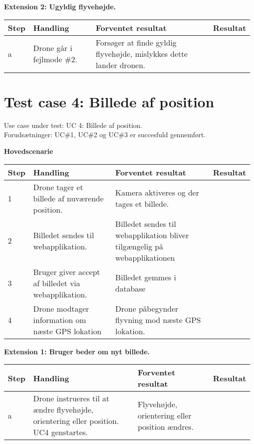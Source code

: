 \textbf{Extension 2: Ugyldig flyvehøjde.}
\begin{table}[H]
	\centering
		\begin{tabular}{|l|p{5 cm}|p{5 cm}|p{3.5 cm}|} 
		\hline
			Step & Handling & Forventet resultat & Resultat\\ \hline
			a & Drone går i fejlmode \#2. & Forsøger at finde gyldig flyvehøjde, mislykkes dette lander dronen. & \\ \hline
		\end{tabular}
\end{table}

\newpage

\section{Test case 4: Billede af position}
Use case under test: UC 4: Billede af position.\\
Forudsætninger:	UC\#1, UC\#2 og UC\#3 er succesfuld gennemført.

\textbf{Hovedscenarie}
\begin{table}[H]
	\centering
		\begin{tabular}{|l|p{5 cm}|p{5 cm}|p{3.5 cm}|} 
		\hline
			Step & Handling & Forventet resultat & Resultat\\ \hline
			1 & Drone tager et billede af nuværende position. & Kamera aktiveres og der tages et billede. & \\ \hline
			2 & Billedet sendes til webapplikation. & Billedet sendes til webapplikation bliver tilgængelig på webapplikationen &  \\ \hline
			3 & Bruger giver accept af billedet via webapplikation. & Billedet gemmes i database  & \\ \hline
			4 & Drone modtager information om næste GPS lokation & Drone påbegynder flyvning mod næste GPS lokation. & \\ \hline

		\end{tabular}
\end{table}


\textbf{Extension 1: Bruger beder om nyt billede.}
\begin{table}[H]
	\centering
		\begin{tabular}{|l|p{5 cm}|p{5 cm}|p{3.5 cm}|} 
		\hline
			Step & Handling & Forventet resultat & Resultat\\ \hline
			a & Drone instrueres til at ændre flyvehøjde, orientering eller position. UC4 genstartes. & Flyvehøjde, orientering eller position ændres. & \\ \hline
		\end{tabular}
\end{table}

